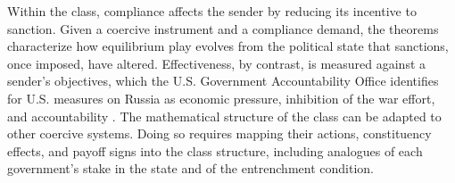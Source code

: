  Within the class, compliance affects the
sender by reducing its incentive to sanction. Given a coercive instrument and a
compliance demand, the theorems characterize how equilibrium play evolves from the
political state that sanctions, once imposed, have altered. Effectiveness, by contrast,
is measured against a sender's objectives, which the U.S. Government Accountability
Office identifies for U.S. measures on Russia as economic pressure, inhibition of the war
effort, and accountability \citep[p.~14]{GAO2025RussiaSanctions}. The mathematical
structure of the class can be adapted to other coercive systems. Doing so requires
mapping their actions, constituency effects, and payoff signs into the class structure,
including analogues of each government's stake in the state and of the entrenchment
condition.

